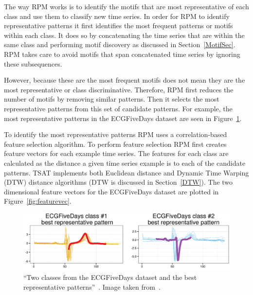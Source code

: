 \documentclass[titlepage, letterpaper, 12pt]{article}
\begin{document}
The way RPM works is to identify the motifs that are most representative of each class and use them to classify new time series.  In order for RPM to identify representative patterns it first identifies the most frequent patterns or motifs within each class.  It does so by concatenating the time series that are within the same class and performing motif discovery as discussed in Section~\ref{MotifSec}.  RPM takes care to avoid motifs that span concatenated time series by ignoring these subsequences.

However, because these are the most frequent motifs does not mean they are the most representative or class discriminative.  Therefore, RPM first reduces the number of motifs by removing similar patterns.  Then it selects the most representative patterns from this set of candidate patterns.  For example, the most representative patterns in the ECGFiveDays dataset are seen in Figure~\ref{fig:representativepatterns}.

To identify the most representative patterns RPM uses a correlation-based feature selection algorithm. To perform feature selection RPM first creates feature vectors for each example time series. The features for each class are calculated as the distance a given time series example is to each of the candidate patterns.  TSAT implements both Euclidean distance and Dynamic Time Warping (DTW) distance algorithms (DTW is discussed in Section~\ref{DTW}).  The two dimensional feature vectors for the ECGFiveDays dataset are plotted in Figure~\ref{fig:featurevec}.

\begin{figure}[H]
	\centering
	\includegraphics[width=.7\textwidth]{pictures/representativepatterns}
	\caption{``Two classes from the ECGFiveDays dataset and the best representative patterns''~\cite{wang2016rpm}.  Image taken from~\cite{wang2016rpm}.}
	\label{fig:representativepatterns}
\end{figure}
\end{document}
